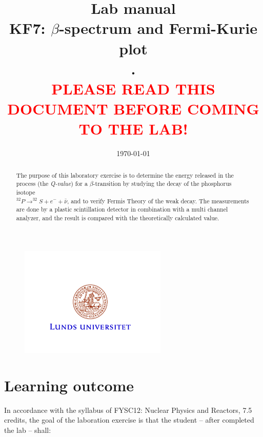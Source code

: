 \documentclass[a4,11pt, notitlepage]{article}
\begin{document}
 
 

\title{\huge{Lab manual
\\KF7: $\beta$-spectrum and Fermi-Kurie plot
\\.
\\\textcolor{red}{PLEASE READ THIS DOCUMENT BEFORE COMING TO THE LAB!}}}
\date{\today}
\maketitle

\vspace{10pt}
\begin{abstract}
The purpose of this laboratory exercise is to determine the energy released in the process (the \textit{Q-value}) for a $\beta$-transition by studying the decay of the phosphorus isotope 
\\$^{32}P\rightarrow ^{32}S + e^- + \bar{\nu}$, and to verify Fermis Theory of the weak decay. The measurements are done by a plastic scintillation detector in combination with a multi channel analyzer, and the result is compared with the theoretically calculated value. 
\end{abstract}

\begin{figure}[htp]
  \vspace{40pt}
  \begin{center}
    \includegraphics[width=7.0cm]{figures/LU.png}
  \end{center}
\end{figure}

\thispagestyle{empty}

\pagebreak
\tableofcontents 
\pagebreak
\section{Learning outcome}

In accordance with the syllabus of FYSC12: Nuclear Physics and Reactors, 7.5
credits, the goal of the laboration exercise is that the student -- after
completed the lab -- shall:
\end{document}
